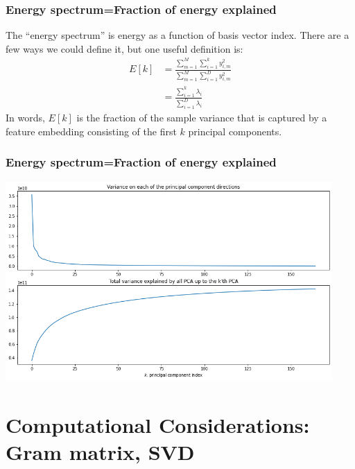 \documentclass{beamer}
\begin{document}
\begin{frame}
  \frametitle{Energy  spectrum=Fraction of energy explained}
  The ``energy spectrum'' is energy as a function of
  basis vector index.  There are a few ways we could define it,
  but one useful definition is:
  \begin{align*}
    E[k] &=\frac{\sum_{m=1}^{M}\sum_{i=1}^{k}y_{i,m}^2}
    {\sum_{m=1}^{M}\sum_{i=1}^{D}y_{i,m}^2}\\
    &=\frac{\sum_{i=1}^{k}\lambda_i}{\sum_{i=1}^{D}\lambda_i}
  \end{align*}
  In words, $E[k]$ is the fraction of the sample variance that is captured by
  a feature embedding consisting of the first $k$ principal components.
\end{frame}

\begin{frame}
  \frametitle{Energy  spectrum=Fraction of energy explained}
  \centerline{\includegraphics[height=3in]{figs/energy_spectrum.png}}
\end{frame}


\section[Gram]{Computational Considerations: Gram matrix, SVD}
\setcounter{subsection}{1}
\end{document}
